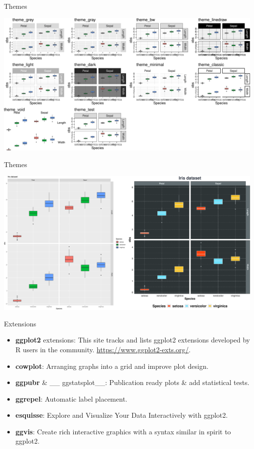 \documentclass[14pt,ignorenonframetext,]{bredelebeamer}
\providecommand{\tightlist}{%
  \setlength{\itemsep}{0pt}\setlength{\parskip}{0pt}}
\begin{document}
\begin{frame}{Themes}

\includegraphics{tidyverse_28_03_files/figure-beamer/unnamed-chunk-81-1.pdf}

\end{frame}

\begin{frame}{Themes}

\includegraphics{tidyverse_28_03_files/figure-beamer/unnamed-chunk-82-1.pdf}

\end{frame}

\begin{frame}{Extensions}

\Large

\begin{itemize}
\tightlist
\item
  \textbf{ggplot2} extensions: This site tracks and lists ggplot2
  extensions developed by R users in the community.
  \url{https://www.ggplot2-exts.org/}.
\item
  \textbf{cowplot}: Arranging graphs into a grid and improve plot
  design.
\item
  \textbf{ggpubr} \& \_\_ ggstatsplot\_\_: Publication ready plots \&
  add statistical tests.
\item
  \textbf{ggrepel}: Automatic label placement.
\item
  \textbf{esquisse}: Explore and Visualize Your Data Interactively with
  ggplot2.
\item
  \textbf{ggvis}: Create rich interactive graphics with a syntax similar
  in spirit to ggplot2.
\end{itemize}

\end{frame}
\end{document}
